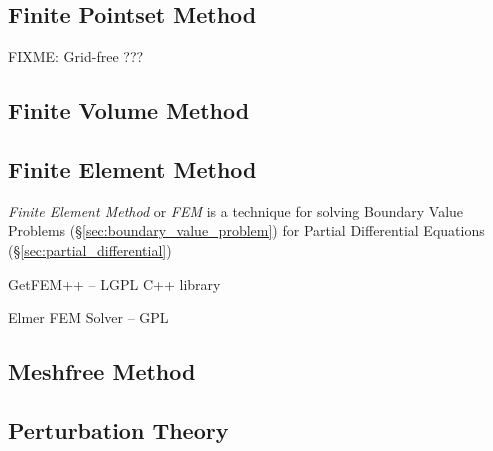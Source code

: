 {%
\subsection{Finite Pointset Method}\label{sec:finite_pointset_method}

FIXME: Grid-free ???



\subsection{Finite Volume Method}\label{sec:finite_volume_method}

\subsection{Finite Element Method}\label{sec:finite_element_method}

\emph{Finite Element Method} or \emph{FEM} is a technique for solving Boundary
Value Problems (\S\ref{sec:boundary_value_problem}) for Partial Differential
Equations (\S\ref{sec:partial_differential})

GetFEM++ -- LGPL C++ library

Elmer FEM Solver -- GPL



\subsection{Meshfree Method}\label{sec:meshfree_method}

\subsection{Perturbation Theory}\label{sec:perturbation_theory}

}
